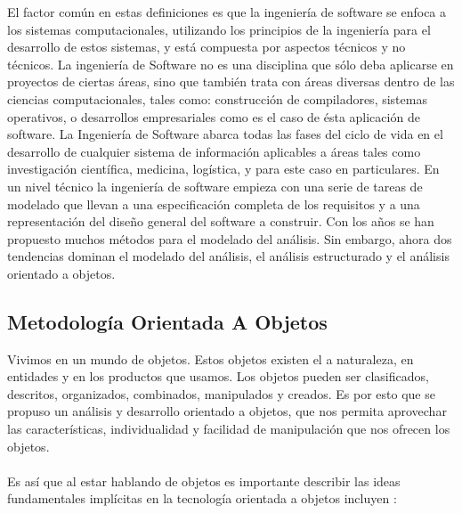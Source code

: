 \documentclass[10pt,a4paper]{article}
\begin{document}
El factor com\'un en estas definiciones es que la ingenier\'ia de software se enfoca a los sistemas computacionales, utilizando los principios de la ingenier\'ia para el desarrollo de estos sistemas, y est\'a compuesta por aspectos t\'ecnicos y no t\'ecnicos.
La ingenier\'ia de Software no es una disciplina que s\'olo deba aplicarse en proyectos de ciertas \'areas, sino que tambi\'en trata con \'areas diversas dentro de las ciencias computacionales, tales como: construcci\'on de compiladores, sistemas operativos, o desarrollos empresariales como es el caso de \'esta aplicaci\'on de software. La Ingenier\'ia de Software abarca todas las fases del ciclo de vida en el desarrollo de cualquier sistema de informaci\'on aplicables a \'areas tales como investigaci\'on cient\'ifica, medicina, log\'istica, y para este caso en particulares.
En un nivel t\'ecnico la ingenier\'ia de software empieza con una serie de tareas de modelado que llevan a una especificaci\'on completa de los requisitos y a una representaci\'on del dise\~no general del software a construir. Con los a\~nos se han propuesto muchos m\'etodos para el modelado del an\'alisis. Sin embargo, ahora dos tendencias dominan el modelado del an\'alisis, el an\'alisis estructurado y el an\'alisis orientado a objetos.


\subsection{Metodología Orientada A Objetos}

Vivimos en un mundo de objetos. Estos objetos existen el a naturaleza, en entidades y en los productos que usamos. Los objetos pueden ser clasificados, descritos, organizados, combinados, manipulados y creados. Es por esto que se propuso un an\'alisis y desarrollo orientado a objetos, que nos permita aprovechar las caracter\'isticas, individualidad y facilidad de manipulaci\'on que nos ofrecen los objetos.
\\
\\
Es as\'i que al estar hablando de objetos es importante describir las ideas fundamentales impl\'icitas en la tecnolog\'ia orientada a objetos incluyen \cite{schneider1992}:
\end{document}
